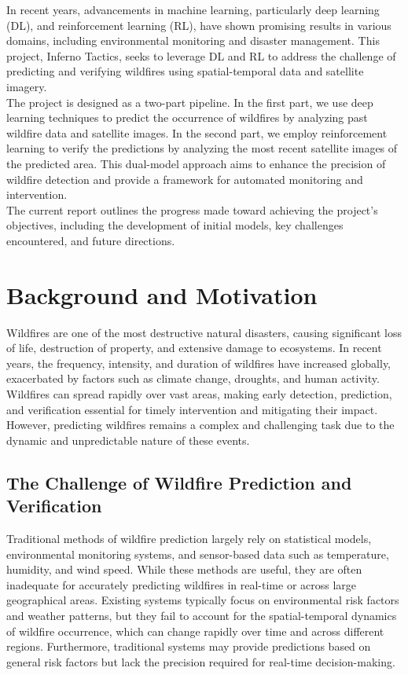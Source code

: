 \documentclass[conference]{IEEEtran}
\begin{document}
\noindent
In recent years, advancements in machine learning, particularly deep learning (DL), and reinforcement learning (RL), have shown promising results in various domains, including environmental monitoring and disaster management. This project, Inferno Tactics, seeks to leverage DL and RL to address the challenge of predicting and verifying wildfires using spatial-temporal data and satellite imagery.\\

\noindent
The project is designed as a two-part pipeline. In the first part, we use deep learning techniques to predict the occurrence of wildfires by analyzing past wildfire data and satellite images. In the second part, we employ reinforcement learning to verify the predictions by analyzing the most recent satellite images of the predicted area. This dual-model approach aims to enhance the precision of wildfire detection and provide a framework for automated monitoring and intervention.\\

\noindent
The current report outlines the progress made toward achieving the project’s objectives, including the development of initial models, key challenges encountered, and future directions.

\section{Background and Motivation}
Wildfires are one of the most destructive natural disasters, causing significant loss of life, destruction of property, and extensive damage to ecosystems. In recent years, the frequency, intensity, and duration of wildfires have increased globally, exacerbated by factors such as climate change, droughts, and human activity. Wildfires can spread rapidly over vast areas, making early detection, prediction, and verification essential for timely intervention and mitigating their impact. However, predicting wildfires remains a complex and challenging task due to the dynamic and unpredictable nature of these events.


\subsection{The Challenge of Wildfire Prediction and Verification}\label{AA}
Traditional methods of wildfire prediction largely rely on statistical models, environmental monitoring systems, and sensor-based data such as temperature, humidity, and wind speed. While these methods are useful, they are often inadequate for accurately predicting wildfires in real-time or across large geographical areas. Existing systems typically focus on environmental risk factors and weather patterns, but they fail to account for the spatial-temporal dynamics of wildfire occurrence, which can change rapidly over time and across different regions. Furthermore, traditional systems may provide predictions based on general risk factors but lack the precision required for real-time decision-making.
\end{document}
